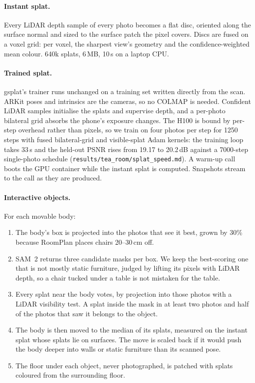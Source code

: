 \documentclass[sigconf,review,anonymous]{acmart}
\newcommand{\measured}[1]{#1}
\begin{document}
\paragraph{Instant splat.} Every LiDAR depth sample of every photo becomes a flat disc, oriented
along the surface normal and sized to the surface patch the pixel covers. Discs are fused on a
voxel grid: per voxel, the sharpest view's geometry and the confidence-weighted mean colour.
\measured{640k} splats, \measured{6\,MB}, \measured{10\,s} on a laptop CPU.

\paragraph{Trained splat.} gsplat's trainer runs unchanged on a training set written directly
from the scan. ARKit poses and intrinsics are the cameras, so no COLMAP is needed. Confident LiDAR
samples initialise the splats and supervise depth, and a per-photo bilateral grid absorbs the
phone's exposure changes. The H100 is bound by per-step overhead rather than pixels, so we train on
four photos per step for 1250 steps with fused bilateral-grid and visible-splat Adam kernels: the
training loop takes \measured{33\,s} and the held-out PSNR rises from \measured{19.17} to
\measured{20.2\,dB} against a 7000-step single-photo schedule
(\texttt{results/tea\_room/splat\_speed.md}). A warm-up call boots the GPU container while the
instant splat is computed. Snapshots stream to the call as they are produced.

\paragraph{Interactive objects.} For each movable body:
\begin{enumerate}
  \item The body's box is projected into the photos that see it best, grown by 30\% because
        RoomPlan places chairs 20--30\,cm off.
  \item SAM~2 returns three candidate masks per box. We keep the best-scoring one that is not
        mostly static furniture, judged by lifting its pixels with LiDAR depth, so a chair tucked
        under a table is not mistaken for the table.
  \item Every splat near the body votes, by projection into those photos with a LiDAR
        visibility test. A splat inside the mask in at least two photos and half of the photos
        that saw it belongs to the object.
  \item The body is then moved to the median of its splats, measured on the instant splat whose
        splats lie on surfaces. The move is scaled back if it would push the body deeper into
        walls or static furniture than its scanned pose.
  \item The floor under each object, never photographed, is patched with splats coloured from the
        surrounding floor.
\end{enumerate}
\end{document}
